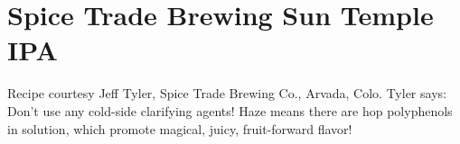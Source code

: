 \documentclass[10pt,oneside]{scrbook}
\begin{document}

\begin{methodandtiming}
 
\begin{mashsteps}
\end{mashsteps}

\begin{fermentationsteps}
\end{fermentationsteps}

\end{methodandtiming}

\pagebreak

\begin{ingredientsblock}

\begin{malts}
\end{malts}

\begin{hops}
\end{hops}

\begin{yeasts}
\end{yeasts}

\end{ingredientsblock}

\chapter*{Spice Trade Brewing Sun Temple IPA}

\begin{aboutblock}
Recipe courtesy Jeff Tyler, Spice Trade Brewing Co., Arvada, Colo. Tyler says:
Don't use any cold-side clarifying agents! Haze means there are hop polyphenols in
solution, which promote magical, juicy, fruit-forward flavor!
\end{aboutblock}
\end{document}
